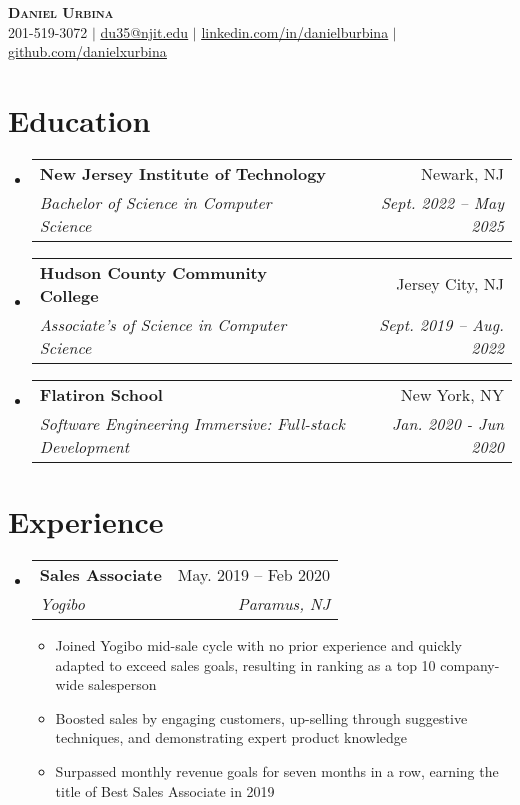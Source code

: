\documentclass[letterpaper,11pt]{article}
\makeatletter
\newcommand{\resumeItem}[1]{
  \item\small{
    {#1 \vspace{-2pt}}
  }
}
\newcommand{\resumeSubheading}[4]{
  \vspace{-2pt}\item
    \begin{tabular*}{0.97\textwidth}[t]{l@{\extracolsep{\fill}}r}
      \textbf{#1} & #2 \\
      \textit{\small#3} & \textit{\small #4} \\
    \end{tabular*}\vspace{-7pt}
}
\newcommand{\resumeSubHeadingListStart}{\begin{itemize}[leftmargin=0.15in, label={}]}
\newcommand{\resumeSubHeadingListEnd}{\end{itemize}}
\newcommand{\resumeItemListStart}{\begin{itemize}}
\newcommand{\resumeItemListEnd}{\end{itemize}\vspace{-5pt}}
\makeatother
\begin{document}

\begin{center}
    \textbf{\Huge \scshape Daniel Urbina} \\ \vspace{1pt}
    \small 201-519-3072 $|$ \href{mailto:x@x.com}{\underline{du35@njit.edu}} $|$ 
    \href{https://linkedin.com/in/...}{\underline{linkedin.com/in/danielburbina}} $|$
    \href{https://github.com/...}{\underline{github.com/danielxurbina}}
\end{center}


\section{Education}
  \resumeSubHeadingListStart
    \resumeSubheading
      {New Jersey Institute of Technology}{Newark, NJ}
      {Bachelor of Science in Computer Science}{Sept. 2022 -- May 2025}
    \resumeSubheading
      {Hudson County Community College}{Jersey City, NJ}
      {Associate's of Science in Computer Science}{Sept. 2019 -- Aug. 2022}
    \resumeSubheading
        {Flatiron School}{New York, NY}
        {Software Engineering Immersive: Full-stack Development}{Jan. 2020 - Jun 2020}
  \resumeSubHeadingListEnd


\section{Experience}
  \resumeSubHeadingListStart
    \resumeSubheading
      {Sales Associate}{May. 2019 -- Feb 2020}
      {Yogibo}{Paramus, NJ}
      \resumeItemListStart
        \resumeItem{Joined Yogibo mid-sale cycle with no prior experience and quickly adapted to exceed sales goals, resulting in ranking as a top 10 company-wide salesperson}
        \resumeItem{Boosted sales by engaging customers, up-selling through suggestive techniques, and demonstrating expert product knowledge}
        \resumeItem{Surpassed monthly revenue goals for seven months in a row, earning the title of Best Sales Associate in 2019}
    \resumeItemListEnd
  \resumeSubHeadingListEnd


\end{document}
